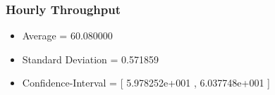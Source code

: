 \documentclass[aps,letterpaper,10pt]{revtex4}
\begin{document}
        \subsubsection{Hourly Throughput}
            \begin{itemize}
                \item Average = 60.080000
                \item Standard Deviation = 0.571859
                \item Confidence-Interval = [ 5.978252e+001 , 6.037748e+001 ]
            \end{itemize}
            \begin{figure}[htp]
                \begin{center}
                \end{center}
            \end{figure}
\end{document}
